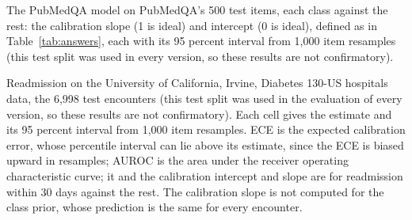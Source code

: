 \documentclass[11pt,letterpaper]{article}
\begin{document}
\begin{table}[H]
\centering\footnotesize
\caption{The PubMedQA model on PubMedQA's 500 test items, each class against the rest: the calibration slope (1 is ideal) and intercept (0 is ideal), defined as in Table~\ref{tab:answers}, each with its 95 percent interval from 1,000 item resamples (this test split was used in every version, so these results are not confirmatory).}
\label{tab:pqaanswers}

\end{table}

\begin{table}[H]
\centering\footnotesize
\caption{Readmission on the University of California, Irvine, Diabetes 130-US hospitals data, the 6,998 test encounters (this test split was used in the evaluation of every version, so these results are not confirmatory). Each cell gives the estimate and its 95 percent interval from 1,000 item resamples. ECE is the expected calibration error, whose percentile interval can lie above its estimate, since the ECE is biased upward in resamples; AUROC is the area under the receiver operating characteristic curve; it and the calibration intercept and slope are for readmission within 30 days against the rest. The calibration slope is not computed for the class prior, whose prediction is the same for every encounter.}
\label{tab:readmission}
\setlength{\tabcolsep}{3.5pt}

\end{table}
\end{document}
